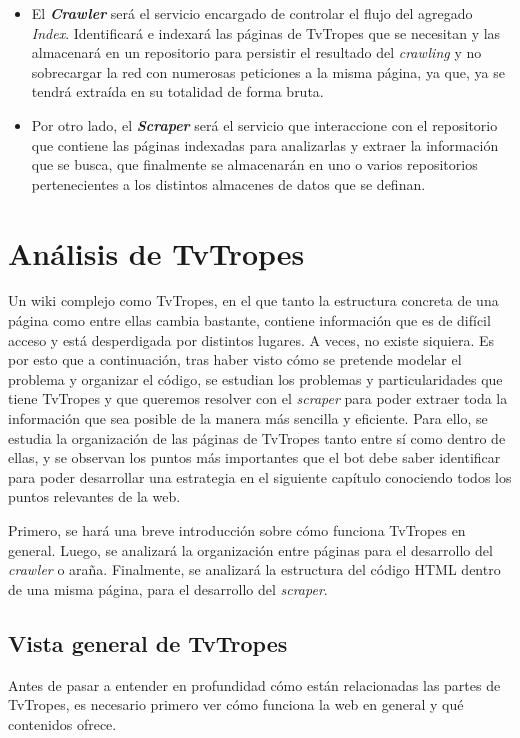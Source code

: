 \begin{itemize}
\begin{itemize}
    \item El \textbf{\textit{Crawler}} será el servicio encargado de controlar
    el flujo del agregado \textit{Index}. Identificará e indexará las páginas de
    TvTropes que se necesitan y las almacenará en un repositorio para persistir
    el resultado del \textit{crawling} y no sobrecargar la red con numerosas
    peticiones a la misma página, ya que, ya se tendrá extraída en su totalidad
    de forma bruta.
    \item Por otro lado, el \textbf{\textit{Scraper}} será el servicio que
    interaccione con el repositorio que contiene las páginas indexadas para
    analizarlas y extraer la información que se busca, que finalmente se
    almacenarán en uno o varios repositorios pertenecientes a los distintos
    almacenes de datos que se definan. 
  \end{itemize}
\end{itemize}

\section{Análisis de TvTropes}
Un wiki complejo como TvTropes, en el que tanto la estructura concreta de una
página como entre ellas cambia bastante, contiene información que es de difícil
acceso y está desperdigada por distintos lugares. A veces, no existe siquiera.
Es por esto que a continuación, tras haber visto cómo se pretende modelar el
problema y organizar el código, se estudian los problemas y particularidades que
tiene TvTropes y que queremos resolver con el \textit{scraper} para poder
extraer toda la información que sea posible de la manera más sencilla y
eficiente. Para ello, se estudia la organización de las páginas de TvTropes
tanto entre sí como dentro de ellas, y se observan los puntos más importantes
que el bot debe saber identificar para poder desarrollar una estrategia en el
siguiente capítulo conociendo todos los puntos relevantes de la web.

Primero, se hará una breve introducción sobre cómo funciona TvTropes en general.
Luego, se analizará la organización entre páginas para el desarrollo del
\textit{crawler} o araña. Finalmente, se analizará la estructura del código HTML
dentro de una misma página, para el desarrollo del \textit{scraper}.

\subsection{Vista general de TvTropes}
Antes de pasar a entender en profundidad cómo están relacionadas las partes de
TvTropes, es necesario primero ver cómo funciona la web en general y qué
contenidos ofrece.

